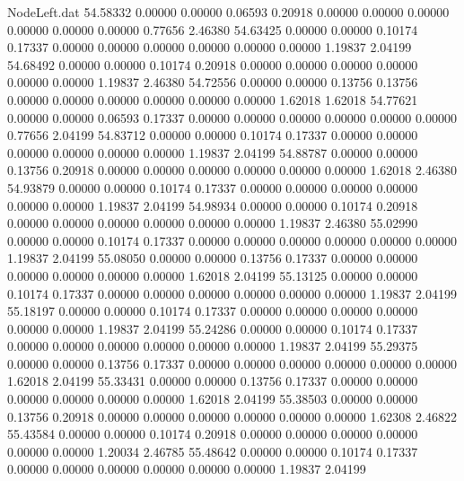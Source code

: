 \begin{filecontents}{NodeLeft.dat}
  54.58332    0.00000    0.00000     0.06593    0.20918    0.00000    0.00000    0.00000    0.00000    0.00000    0.00000    0.77656    2.46380
  54.63425    0.00000    0.00000     0.10174    0.17337    0.00000    0.00000    0.00000    0.00000    0.00000    0.00000    1.19837    2.04199
  54.68492    0.00000    0.00000     0.10174    0.20918    0.00000    0.00000    0.00000    0.00000    0.00000    0.00000    1.19837    2.46380
  54.72556    0.00000    0.00000     0.13756    0.13756    0.00000    0.00000    0.00000    0.00000    0.00000    0.00000    1.62018    1.62018
  54.77621    0.00000    0.00000     0.06593    0.17337    0.00000    0.00000    0.00000    0.00000    0.00000    0.00000    0.77656    2.04199
  54.83712    0.00000    0.00000     0.10174    0.17337    0.00000    0.00000    0.00000    0.00000    0.00000    0.00000    1.19837    2.04199
  54.88787    0.00000    0.00000     0.13756    0.20918    0.00000    0.00000    0.00000    0.00000    0.00000    0.00000    1.62018    2.46380
  54.93879    0.00000    0.00000     0.10174    0.17337    0.00000    0.00000    0.00000    0.00000    0.00000    0.00000    1.19837    2.04199
  54.98934    0.00000    0.00000     0.10174    0.20918    0.00000    0.00000    0.00000    0.00000    0.00000    0.00000    1.19837    2.46380
  55.02990    0.00000    0.00000     0.10174    0.17337    0.00000    0.00000    0.00000    0.00000    0.00000    0.00000    1.19837    2.04199
  55.08050    0.00000    0.00000     0.13756    0.17337    0.00000    0.00000    0.00000    0.00000    0.00000    0.00000    1.62018    2.04199
  55.13125    0.00000    0.00000     0.10174    0.17337    0.00000    0.00000    0.00000    0.00000    0.00000    0.00000    1.19837    2.04199
  55.18197    0.00000    0.00000     0.10174    0.17337    0.00000    0.00000    0.00000    0.00000    0.00000    0.00000    1.19837    2.04199
  55.24286    0.00000    0.00000     0.10174    0.17337    0.00000    0.00000    0.00000    0.00000    0.00000    0.00000    1.19837    2.04199
  55.29375    0.00000    0.00000     0.13756    0.17337    0.00000    0.00000    0.00000    0.00000    0.00000    0.00000    1.62018    2.04199
  55.33431    0.00000    0.00000     0.13756    0.17337    0.00000    0.00000    0.00000    0.00000    0.00000    0.00000    1.62018    2.04199
  55.38503    0.00000    0.00000     0.13756    0.20918    0.00000    0.00000    0.00000    0.00000    0.00000    0.00000    1.62308    2.46822
  55.43584    0.00000    0.00000     0.10174    0.20918    0.00000    0.00000    0.00000    0.00000    0.00000    0.00000    1.20034    2.46785
  55.48642    0.00000    0.00000     0.10174    0.17337    0.00000    0.00000    0.00000    0.00000    0.00000    0.00000    1.19837    2.04199

\end{filecontents}
